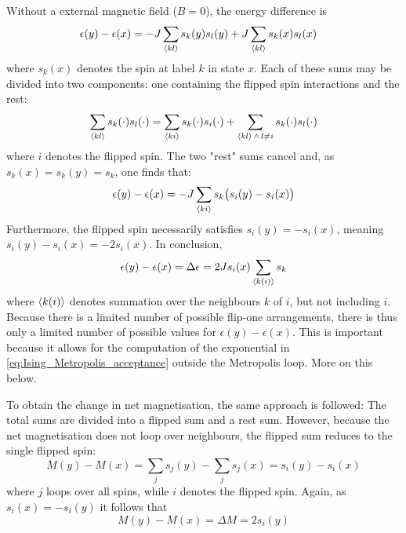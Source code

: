 \documentclass[nofootinbib,reprint,english]{revtex4-1}
\begin{document}
Without a external magnetic field (\(B=0\)), the energy difference is
\begin{align*}
\epsilon(y)-\epsilon(x)&=-J\sum_{\expval{kl}}s_k(y)s_l(y)+J\sum_{\expval{kl}}s_k(x)s_l(x)
\end{align*}
where \(s_k(x)\) denotes the spin at label \(k\) in state \(x\). Each of these sums may be divided into two components: one containing the flipped spin interactions and the rest:
\[\sum_{\expval{kl}}s_k(\cdot)s_l(\cdot)=\sum_{\expval{ki}}s_k(\cdot)s_i(\cdot)+\sum_{\expval{kl}\,\wedge\,l\neq i}s_k(\cdot)s_l(\cdot)\]
where \(i\) denotes the flipped spin. The two "rest" sums cancel and, as \(s_k(x)=s_k(y)=s_k\), one finds that:
\[\epsilon(y)-\epsilon(x)=-J\sum_{\expval{ki}}s_k\big(s_i(y)-s_i(x)\big)\]
Furthermore, the flipped spin necessarily satisfies \(s_i(y)=-s_i(x)\), meaning \(s_i(y)-s_i(x)=-2s_i(x)\). In conclusion,
\begin{equation}\label{eq:Ising_flip_one_energy_change}
\epsilon(y)-\epsilon(x)=\Delta\epsilon=2Js_i(x)\sum_{\expval{k(i)}}s_k
\end{equation}
where \(\expval{k(i)}\) denotes summation over the neighbours \(k\) of \(i\), but not including \(i\). Because there is a limited number of possible flip-one arrangements, there is thus only a limited number of possible values for \(\epsilon(y)-\epsilon(x)\). This is important because it allows for the computation of the exponential in \eqref{eq:Ising_Metropolis_acceptance} outside the Metropolis loop. More on this below.

To obtain the change in net magnetisation, the same approach is followed: The total sums are divided into a flipped sum and a rest sum. However, because the net magnetisation does not loop over neighbours, the flipped sum reduces to the single flipped spin:
\[M(y)-M(x)=\sum_{j}s_j(y)-\sum_{j}s_j(x)=s_i(y)-s_i(x)\]
where \(j\) loops over all spins, while \(i\) denotes the flipped spin. Again, as \(s_i(x)=-s_i(y)\) it follows that
\begin{equation}
M(y)-M(x)=\Delta M=2s_i(y)
\end{equation}
\end{document}
